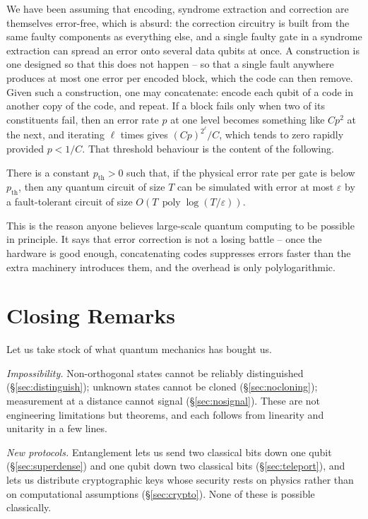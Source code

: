 \documentclass[a4paper]{scrartcl}
\DeclareMathOperator{\poly}{poly}
\begin{document}
We have been assuming that encoding, syndrome extraction and correction are themselves error-free, which is absurd: the correction circuitry is built from the same faulty components as everything else, and a single faulty gate in a syndrome extraction can spread an error onto several data qubits at once. A  construction is one designed so that this does not happen -- so that a single fault anywhere produces at most one error per encoded block, which the code can then remove. Given such a construction, one may concatenate: encode each qubit of a code in another copy of the code, and repeat. If a block fails only when two of its constituents fail, then an error rate $p$ at one level becomes something like $Cp^2$ at the next, and iterating $\ell$ times gives $(Cp)^{2^\ell}/C$, which tends to zero rapidly provided $p<1/C$. That threshold behaviour is the content of the following.

\begin{theorem}
	There is a constant $p_{\mathrm{th}}>0$ such that, if the physical error rate per gate is below $p_{\mathrm{th}}$, then any quantum circuit of size $T$ can be simulated with error at most $\varepsilon$ by a fault-tolerant circuit of size $O\left(T\,\poly\log(T/\varepsilon)\right)$.
\end{theorem}

This is the reason anyone believes large-scale quantum computing to be possible in principle. It says that error correction is not a losing battle -- once the hardware is good enough, concatenating codes suppresses errors faster than the extra machinery introduces them, and the overhead is only polylogarithmic.

\section{Closing Remarks}

Let us take stock of what quantum mechanics has bought us.

\emph{Impossibility.} Non-orthogonal states cannot be reliably distinguished (\S\ref{sec:distinguish}); unknown states cannot be cloned (\S\ref{sec:nocloning}); measurement at a distance cannot signal (\S\ref{sec:nosignal}). These are not engineering limitations but theorems, and each follows from linearity and unitarity in a few lines.

\emph{New protocols.} Entanglement lets us send two classical bits down one qubit (\S\ref{sec:superdense}) and one qubit down two classical bits (\S\ref{sec:teleport}), and lets us distribute cryptographic keys whose security rests on physics rather than on computational assumptions (\S\ref{sec:crypto}). None of these is possible classically.
\end{document}
